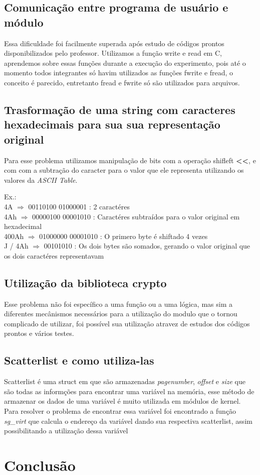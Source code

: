 \subsection{Comunicação entre programa de usuário e módulo}

Essa dificuldade foi facilmente superada após estudo de códigos prontos disponibilizados pelo professor.
Utilizamos a função write e read em C, aprendemos sobre essas funções durante a execução do experimento, pois até o momento todos integrantes só havim utilizados as funções fwrite e fread, o conceito é parecido, entretanto fread e fwrite só são utilizados para arquivos.

\subsection{Trasformação de uma string com caracteres hexadecimais para sua sua representação original}

Para esse problema utilizamos manipulação de bits com a operação shifleft \textbf{\textless\textless}, e com com a subtração do caracter para o valor que ele representa utilizando os valores da \textit{ASCII Table}.
\begin{flushleft}
\begin{em}
Ex.:\\
4A      $\Rightarrow$ 00110100 01000001 : 2 caractéres\\
4Ah     $\Rightarrow$ 00000100 00001010 : Caractéres subtraídos para o valor original em hexadecimal\\
400Ah   $\Rightarrow$ 01000000 00001010 : O primero byte é shiftado 4 vezes\\
J / 4Ah $\Rightarrow$ 00101010          : Os dois bytes são somados, gerando o valor original que os dois caractéres representavam \\ 
\end{em}
\end{flushleft}

\subsection{Utilização da biblioteca crypto}
Esse problema não foi específico a uma função ou a uma lógica, mas sim a diferentes mecânismos necessários para a utilização do modulo que o tornou complicado de utilizar, foi possível sua utilização atravez de estudos dos códigos prontos e vários testes. 

\subsection{Scatterlist e como utiliza-las}
Scatterlist é uma struct em que são armazenadas \textit{pagenumber}, \textit{offset} e \textit{size} que são todas as informções para encontrar uma variável na memória, esse método de armazenar os dados de uma variável é muito utilizada em módulos de kernel.\\
Para resolver o problema de encontrar essa variável foi encontrado a função \textit{sg\_virt} que calcula o endereço da variável dando sua respectiva scatterlist, assim possibilitando a utilização dessa variável


\section{Conclusão}

